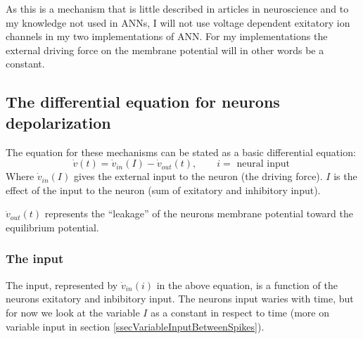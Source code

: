 As this is a mechanism that is little described in articles in neuroscience and to my knowledge not used in ANNs, I will not use voltage dependent exitatory ion channels in my two implementations of ANN. 
For my implementations the external driving force on the membrane potential will in other words be a constant.



\subsection{The differential equation for neurons depolarization}
The equation for these mechanisms can be stated as a basic differential equation:
\begin{equation}
	\dot{v}(t) = \dot{v}_{in}(I) - \dot{v}_{out}(t), \qquad i = \text{ neural input }
\end{equation}
Where $\dot{v}_{in}(I)$ gives the external input to the neuron (the driving force). %
$I$ is the effect of the input to the neuron (sum of exitatory and inhibitory input).

$\dot{v}_{out}(t)$ represents the ``leakage'' of the neurons membrane potential toward the equilibrium potential.


\subsubsection{The input}
The input, represented by $\dot{v}_{in}(i)$ in the above equation, is a function of the neurons exitatory and inbibitory input. 
The neurons input waries with time, but for now we look at the variable $I$ as a constant in respect to time 
(more on variable input in section \ref{ssecVariableInputBetweenSpikes}).

